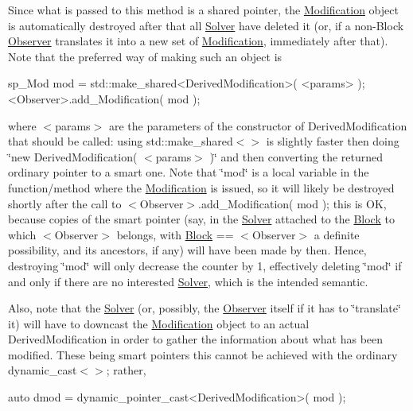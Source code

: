 Since what is passed to this method is a shared pointer, the \mbox{\hyperlink{class_s_m_spp__di__unipi__it_1_1_modification}{Modification}} object is automatically destroyed after that all \mbox{\hyperlink{class_s_m_spp__di__unipi__it_1_1_solver}{Solver}} have deleted it (or, if a non-\/\+Block \mbox{\hyperlink{class_s_m_spp__di__unipi__it_1_1_observer}{Observer}} translates it into a new set of \mbox{\hyperlink{class_s_m_spp__di__unipi__it_1_1_modification}{Modification}}, immediately after that). Note that the preferred way of making such an object is \begin{DoxyVerb}sp_Mod mod = std::make_shared<DerivedModification>( <params> );
<Observer>.add_Modification( mod );
\end{DoxyVerb}


where $<$params$>$ are the parameters of the constructor of Derived\+Modification that should be called\+: using std\+::make\+\_\+shared$<$$>$ is slightly faster then doing \char`\"{}new Derived\+Modification( $<$params$>$ )\char`\"{} and then converting the returned ordinary pointer to a smart one. Note that \char`\"{}mod\char`\"{} is a local variable in the function/method where the \mbox{\hyperlink{class_s_m_spp__di__unipi__it_1_1_modification}{Modification}} is issued, so it will likely be destroyed shortly after the call to $<$\+Observer$>$.add\+\_\+\+Modification( mod ); this is OK, because copies of the smart pointer (say, in the \mbox{\hyperlink{class_s_m_spp__di__unipi__it_1_1_solver}{Solver}} attached to the \mbox{\hyperlink{class_s_m_spp__di__unipi__it_1_1_block}{Block}} to which $<$\+Observer$>$ belongs, with \mbox{\hyperlink{class_s_m_spp__di__unipi__it_1_1_block}{Block}} == $<$\+Observer$>$ a definite possibility, and its ancestors, if any) will have been made by then. Hence, destroying \char`\"{}mod\char`\"{} will only decrease the counter by 1, effectively deleting \char`\"{}mod\char`\"{} if and only if there are no interested \mbox{\hyperlink{class_s_m_spp__di__unipi__it_1_1_solver}{Solver}}, which is the intended semantic.

Also, note that the \mbox{\hyperlink{class_s_m_spp__di__unipi__it_1_1_solver}{Solver}} (or, possibly, the \mbox{\hyperlink{class_s_m_spp__di__unipi__it_1_1_observer}{Observer}} itself if it has to \char`\"{}translate\char`\"{} it) will have to downcast the \mbox{\hyperlink{class_s_m_spp__di__unipi__it_1_1_modification}{Modification}} object to an actual Derived\+Modification in order to gather the information about what has been modified. These being smart pointers this cannot be achieved with the ordinary dynamic\+\_\+cast$<$$>$; rather, \begin{DoxyVerb}auto dmod = dynamic_pointer_cast<DerivedModification>( mod );
\end{DoxyVerb}


